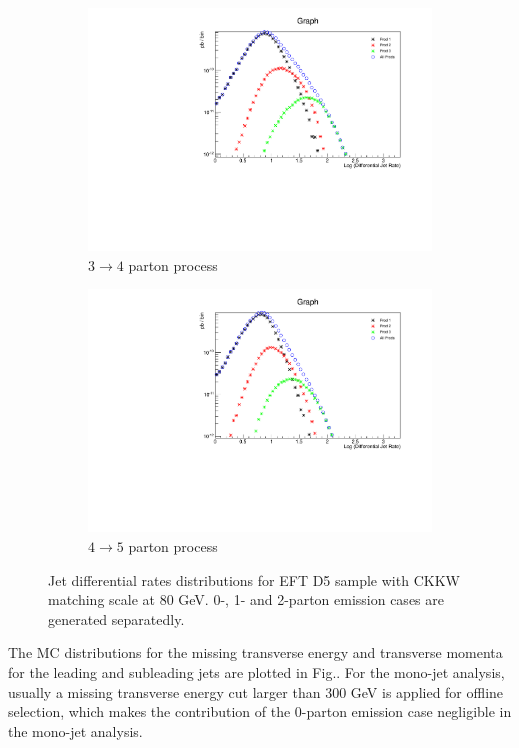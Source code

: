 \begin{figure} [thbp]
\begin{subfigure}{0.48\linewidth}
    \includegraphics[width=\linewidth]{figures/monojet_appendix/HistoJet3to4_80.pdf}
    \caption{$3\rightarrow4$ parton process}
  \end{subfigure}
  \begin{subfigure}{0.48\linewidth}
    \includegraphics[width=\linewidth]{figures/monojet_appendix/HistoJet4to5_80.pdf}
    \caption{$4\rightarrow5$ parton process}
  \end{subfigure}
  \caption{Jet differential rates distributions for EFT D5 sample with CKKW matching scale at 80 GeV. 0-, 1- and 2-parton emission cases are generated separatedly.}
  \label{fig:CKKW_D5_80}
\end{figure}

The MC distributions for the missing transverse energy and transverse momenta for the leading and subleading jets are plotted in Fig.. For the mono-jet analysis, usually a missing transverse energy cut larger than 300 GeV is applied for offline selection, which makes the contribution of the 0-parton emission case negligible in the mono-jet analysis.

